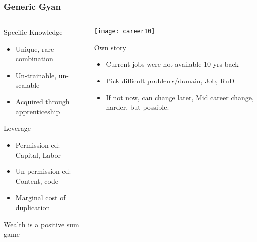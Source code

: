 \begin{frame}[fragile]\frametitle{Generic Gyan}
\begin{columns}
    \begin{column}[T]{0.4\linewidth}
			Specific Knowledge

      \begin{itemize}
			\item Unique, rare combination
			\item Un-trainable, un-scalable
			\item Acquired through apprenticeship
			\end{itemize}
			
			Leverage
      \begin{itemize}
			\item Permission-ed: Capital, Labor
			\item Un-permission-ed: Content, code
			\item Marginal cost of duplication
			\end{itemize}
			
			Wealth is a positive sum game
			
    \end{column}
    \begin{column}[T]{0.6\linewidth}
		
			\begin{center}
			\texttt{[image: career10]}
			\end{center}

			Own story
      \begin{itemize}
			\item Current jobs were not available 10 yrs back
			\item Pick difficult problems/domain, Job, RnD
			\item If not now, can change later, Mid career change, harder, but possible.
			\end{itemize}		
    \end{column}
  \end{columns}
	
\end{frame}
